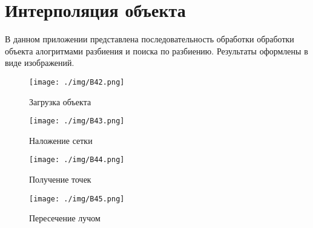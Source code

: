 ﻿\chapter{Интерполяция объекта}\label{screenshots}

В данном приложении представлена последовательность обработки обработки объекта алогритмами разбиения и поиска по разбиению.
Результаты оформлены в виде изображений.

\begin{figure}
\begin{center}
\texttt{[image: ./img/B42.png]}
\end{center}
\caption{Загрузка объекта}
\label{pic:B42}
\end{figure}


\begin{figure}
\begin{center}
\texttt{[image: ./img/B43.png]}
\end{center}
\caption{Наложение сетки}
\label{pic:B43}
\end{figure}


\begin{figure}
\begin{center}
\texttt{[image: ./img/B44.png]}
\end{center}
\caption{Получение точек}
\label{pic:B44}
\end{figure}


\begin{figure}
\begin{center}
\texttt{[image: ./img/B45.png]}
\end{center}
\caption{Пересечение лучом}
\label{pic:B45}
\end{figure}
